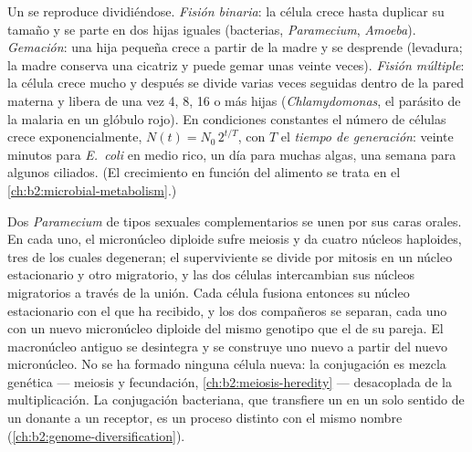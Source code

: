 \begin{definition}\label{def:b2:unicellular-diversity:division}
Un  se reproduce dividiéndose. \emph{Fisión
binaria}: la célula crece hasta duplicar su tamaño y se parte en dos
hijas iguales (bacterias, \emph{Paramecium}, \emph{Amoeba}).
\emph{Gemación}: una hija pequeña crece a partir de la madre y se
desprende (levadura; la madre conserva una cicatriz y puede gemar unas
veinte veces). \emph{Fisión múltiple}: la célula crece mucho y después se
divide varias veces seguidas dentro de la pared materna y libera de una
vez 4, 8, 16 o más hijas (\emph{Chlamydomonas}, el parásito de la malaria
en un glóbulo rojo). En condiciones constantes el número de células
crece exponencialmente, $N(t) = N_0\,2^{t/T}$, con $T$ el
\emph{tiempo de generación}: veinte minutos
para \emph{E.~coli} en medio rico, un día para muchas algas, una semana
para algunos ciliados. (El crecimiento en función del alimento se trata
en el \cref{ch:b2:microbial-metabolism}.)
\end{definition}

\begin{proposition}\label{prop:b2:unicellular-diversity:conjugation}
Dos \emph{Paramecium} de tipos sexuales complementarios se unen por sus
caras orales. En cada uno, el micronúcleo diploide sufre meiosis y da
cuatro núcleos haploides, tres de los cuales degeneran; el superviviente
se divide por mitosis en un núcleo estacionario y otro migratorio, y las
dos células intercambian sus núcleos migratorios a través de la unión.
Cada célula fusiona entonces su núcleo estacionario con el que ha
recibido, y los dos compañeros se separan, cada uno con un nuevo
micronúcleo diploide del mismo genotipo que el de su pareja. El
macronúcleo antiguo se desintegra y se construye uno nuevo a partir del
nuevo micronúcleo. No se ha formado ninguna célula nueva: la conjugación
es mezcla genética --- meiosis y fecundación,
\cref{ch:b2:meiosis-heredity} --- desacoplada de la multiplicación.
La conjugación bacteriana, que transfiere un  en un solo sentido
de un donante a un receptor, es un proceso distinto con el mismo nombre
(\cref{ch:b2:genome-diversification}).
\end{proposition}

